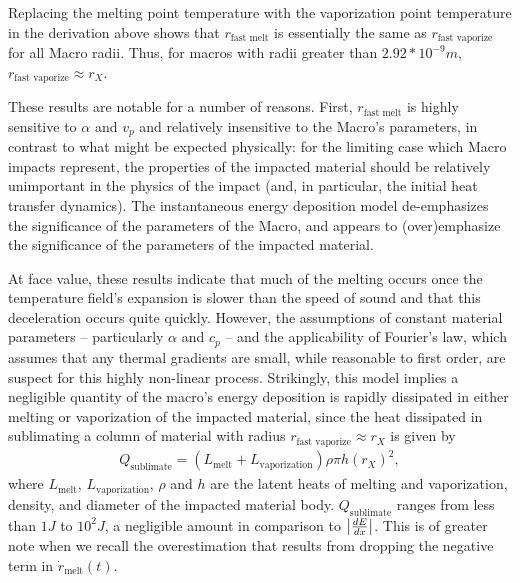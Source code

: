 \documentclass[prd,reprint,10pt]{revtex4-1}
\newcommand*\te[1]{\text{#1}}
\begin{document}
Replacing the melting point temperature with the vaporization point temperature in the derivation above shows that $r_\te{fast melt}$ is essentially the same as $r_\te{fast vaporize}$ for all Macro radii.  Thus, for macros with radii greater than $2.92*10^{-9} m$, $r_\te{fast vaporize} \approx r_X$.  

\par These results are notable for a number of reasons. First, $r_\te{fast melt}$ is highly sensitive to $\alpha$ and $v_p$ and relatively insensitive to the Macro's parameters, in contrast to what might be expected physically: for the limiting case which Macro impacts represent, the properties of the impacted material should be relatively unimportant in the physics of the impact (and, in particular, the initial heat transfer dynamics).  The instantaneous energy deposition model de-emphasizes the significance of the parameters of the Macro, and appears to (over)emphasize the significance of the parameters of the impacted material. 

At face value, these results indicate that much of the melting occurs once the temperature field's expansion is slower than the speed of sound and that this deceleration occurs quite quickly.  
However, the assumptions of constant material parameters -- particularly $\alpha$ and $c_p$ -- and the applicability of Fourier's law, which assumes that any thermal gradients are small, while reasonable to first order, are suspect for this highly non-linear process.  Strikingly, this model implies a negligible quantity of the macro's energy deposition is rapidly dissipated in either melting or vaporization of the impacted material, since the heat dissipated in sublimating a column of material with radius $r_\te{fast vaporize} \approx r_X$ is given by
\begin{align}
Q_\te{sublimate} = (L_\te{melt} + L_\te{vaporization})\rho \pi h(r_X)^2,
\end{align}
where $L_\te{melt}$, $L_\te{vaporization}$, $\rho$ and $h$ are the latent heats of melting and vaporization, density, and diameter of the impacted material body.  $Q_\te{sublimate}$ ranges from less than $1 J$ to $10^2 J$, a negligible amount in comparison to $\abs{\frac{dE}{dx}}$.  This is of greater note when we recall the overestimation that results from dropping the negative term in $\dot r_\te{melt}(t)$.
\end{document}
